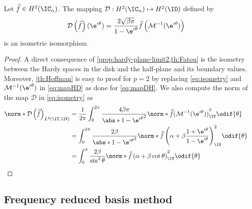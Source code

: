 \begin{corollary} \label{cor:isometry}
Let $\widehat{f} \in H^2(\IC_\alpha)$. The mapping $\mathcal{D}: H^2(\IC_\alpha) \mapsto H^2(\ID)$ defined by 
\begin{equation} \label{eq:isometry}
    \mathcal{D}\left( \widehat{f} \right)(\e^{\imath \theta}) =  \frac{2 \sqrt{\beta \pi}}{1-\e^{\imath \theta}}\widehat{f} \left(\mathcal{M}^{-1}(\e^{\imath \theta}) \right)
\end{equation}
is an isometric isomorphism.
\end{corollary}

\begin{proof}
    A direct consequence of \cref{prop:hardy-plane-limit2,th:Fatou} is the isometry between the Hardy spaces in the disk and the half-plane and its boundary values. Moreover, \cref{th:Hoffman} is easy to proof for $p=2$ by replacing \cref{eq:isometry} and $\mathcal{M}^{-1}(\e^{\imath \theta})$ in \cref{eq:mapHD} as done for \cref{eq:mapDH}.
    We also compute the norm of the map $\mathcal{D}$ in \cref{eq:isometry} as
    \begin{align}
        \norm*{\mathcal{D} \left( \widehat{f} \right)}_{L^2(\IT,\IV)} &= \frac{1}{2\pi} \int_0^{2\pi} \frac{4 \beta \pi}{\abs*{1-\e^{\imath \theta}}^2} \norm*{\widehat{f}(\mathcal{M}^{-1}(\e ^{\imath\theta}))}^2_{\IV} \odif{\theta} \\
        &= \int_0^{2\pi} \frac{2 \beta}{\abs*{1-\e^{\imath \theta}}^2} \norm*{\widehat{f} \left( \alpha + \beta \frac{1+\e^{\imath \theta}}{1-\e^{\imath \theta}} \right)}^2_{\IV} \odif{\theta} \\
        &= \int_0^{\pi} \frac{2\beta}{\sin^2 \theta} \norm*{\widehat{f} \left( \alpha + \beta \cot \theta \right)}^2_{\IV} \odif{\theta}  \label{eq:int-rule}
\end{align}
 \end{proof}


\subsection{Frequency reduced basis method} \label{ssec:FRB-harmonic}

